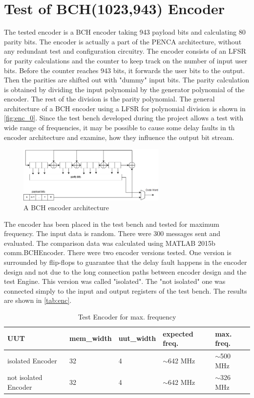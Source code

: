 \section{Test of BCH(1023,943) Encoder}
The tested encoder is a BCH encoder taking 943 payload bits and calculating 80 parity bits. The encoder is actually a part of the PENCA architecture, without any redundant test and configuration circuitry. The encoder consists of an LFSR for parity calculations and the counter to keep track on the number of input user bits. Before the counter reaches 943 bits, it forwards the user bits to the output. Then the parities are shifted out with "dummy" input bits. The parity calculation is obtained by dividing the input polynomial by the generator polynomial of the encoder. The rest of the division is the parity polynomial. The general architecture of a BCH encoder using a LFSR for polynomial division is shown in \autoref{fig:enc_0}. Since the test bench developed during the project allows a test with wide range of frequencies, it may be possible to cause some delay faults in th encoder architecture and examine, how they influence the output bit stream.

\begin{figure}[h]
\centering
\includegraphics[width=0.65\textwidth]{figures/BCH_ENC.png}
\caption{A BCH encoder architecture \cite{art:BCH_implement}}
\label{fig:enc_0}
\end{figure}

The encoder has been placed in the test bench and tested for maximum frequency. The input data is random. There were 300 messages sent and evaluated. The comparison data was calculated using MATLAB 2015b comm.BCHEncoder. There were two encoder versions tested. One version is surrounded by flip-flops to guarantee that the delay fault happens in the encoder design and not due to the long connection paths between encoder design and the test Engine. This version was called "isolated". The "not isolated" one was connected simply to the input and output registers of the test bench. The results are shown in \autoref{tab:enc}.

\begin{table}[h]
\begin{tabular}{@{}lllll@{}}
\toprule
UUT                       &mem\_width   &uut\_width &expected freq. &max. freq.\\ 
\midrule
isolated Encoder                  & 32          & 4      & $\sim$642 MHz & $\sim$500 MHz \\
not isolated Encoder              & 32          & 4      & $\sim$642 MHz & $\sim$326 MHz \\
\bottomrule
\end{tabular}
\centering
\caption{Test Encoder for max. frequency}\label{tab:enc}
\end{table}

